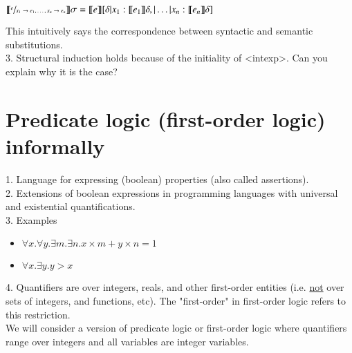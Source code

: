 \documentclass{report}[12pt]
\begin{document}
\begin{corollary}
    $\llbracket  \sfrac{e}{x_1 \rightarrow e_1, \ldots, x_n \rightarrow e_n}  \rrbracket \sigma = \llbracket  e  \rrbracket [\delta | x_1 : \llbracket  e_1  \rrbracket \delta, | \ldots | x_n : \llbracket  e_n  \rrbracket \delta]$
\end{corollary}
This intuitively says the correspondence between syntactic and semantic substitutions. \\
3. Structural induction holds because of the initiality of <intexp>. Can you explain why it is the case?
\section{Predicate logic (first-order logic) informally}
1. Language for expressing (boolean) properties (also called assertions). \\
2. Extensions of boolean expressions in programming languages with universal and existential quantifications. \\
3. Examples
\begin{itemize}
    \item $\forall x. \forall y. \exists m. \exists n. x \times m + y \times n = 1$
    \item $\forall x. \exists y. y > x$
\end{itemize}
4. Quantifiers are over integers, reals, and other first-order entities (i.e. \underline{not} over sets of integers, and functions, etc). The "first-order" in first-order logic refers to this restriction. \\
We will consider a version of predicate logic or first-order logic where quantifiers range over integers and all variables are integer variables.
\end{document}
